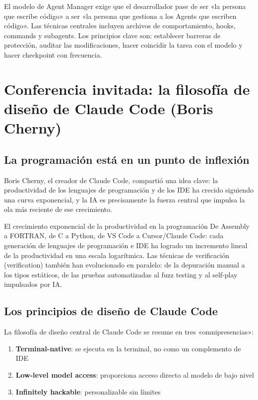 \documentclass[a4paper]{article}
\begin{document}
El modelo de Agent Manager exige que el desarrollador pase de ser «la persona que escribe código» a ser «la persona que gestiona a los Agents que escriben código». Las técnicas centrales incluyen archivos de comportamiento, hooks, commands y subagents. Los principios clave son: establecer barreras de protección, auditar las modificaciones, hacer coincidir la tarea con el modelo y hacer checkpoint con frecuencia.

\section{Conferencia invitada: la filosofía de diseño de Claude Code (Boris Cherny)}

\subsection{La programación está en un punto de inflexión}

Boris Cherny, el creador de Claude Code, compartió una idea clave: la productividad de los lenguajes de programación y de los IDE ha crecido siguiendo una curva exponencial, y la IA es precisamente la fuerza central que impulsa la ola más reciente de ese crecimiento.

\begin{knowledgebox}{El crecimiento exponencial de la productividad en la programación}
De Assembly a FORTRAN, de C a Python, de VS Code a Cursor/Claude Code: cada generación de lenguajes de programación e IDE ha logrado un incremento lineal de la productividad en una escala logarítmica. Las técnicas de verificación (verification) también han evolucionado en paralelo: de la depuración manual a los tipos estáticos, de las pruebas automatizadas al fuzz testing y al self-play impulsados por IA.
\end{knowledgebox}

\subsection{Los principios de diseño de Claude Code}

La filosofía de diseño central de Claude Code se resume en tres «omnipresencias»:

\begin{enumerate}
    \item \textbf{Terminal-native}: se ejecuta en la terminal, no como un complemento de IDE
    \item \textbf{Low-level model access}: proporciona acceso directo al modelo de bajo nivel
    \item \textbf{Infinitely hackable}: personalizable sin límites
\end{enumerate}
\end{document}
